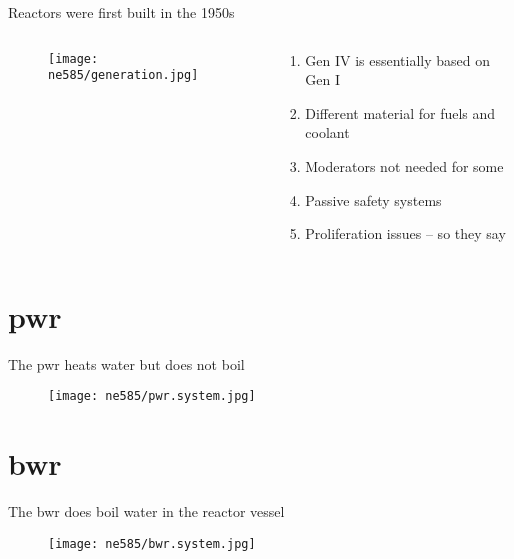 \documentclass[aspectratio=1610,pdftex,dvipsnames,compress,xcolor={dvipsnames}]{beamer}
\newcommand{\acs}{\acrshort} %
\begin{document}
\addtocounter{framenumber}{-2} 
\begin{frame}{Reactors were first built in the 1950s}
    \begin{columns}[t]

        \begin{column}{0.55\textwidth}
            \begin{figure}
                \centering
                \texttt{[image: ne585/generation.jpg]}
            \end{figure}
        \end{column}

        \begin{column}{0.45\textwidth}
            \begin{enumerate}[series=outerlist,topsep=0pt,itemsep=21pt,leftmargin=*,label=(\arabic*)]
                \item[]Gen IV is essentially based on Gen I
                \item[]Different material for fuels and coolant
                \item[]Moderators not needed for some
                \item[]Passive safety systems
                \item[]Proliferation issues -- so they say
            \end{enumerate}
        \end{column}

    \end{columns}
\end{frame}


\section{\acs{pwr}}


\addtocounter{framenumber}{-1} 
\begin{frame}{The \acs{pwr} heats water but does not boil}
    \begin{figure}
        \centering
        \texttt{[image: ne585/pwr.system.jpg]}
    \end{figure}
\end{frame}


\section{\acs{bwr}}


\addtocounter{framenumber}{-1} 
\begin{frame}{The \acs{bwr} does boil water in the reactor vessel}
    \begin{figure}
        \centering
        \texttt{[image: ne585/bwr.system.jpg]}
    \end{figure}
\end{frame}
\end{document}
